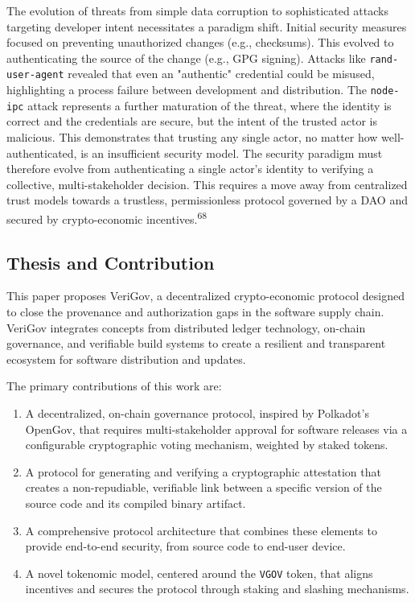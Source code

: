 \documentclass{article}
\begin{document}
The evolution of threats from simple data corruption to sophisticated attacks targeting developer intent necessitates a paradigm shift. Initial security measures focused on preventing unauthorized changes (e.g., checksums). This evolved to authenticating the source of the change (e.g., GPG signing). Attacks like \lstinline{rand-user-agent} revealed that even an "authentic" credential could be misused, highlighting a process failure between development and distribution. The \lstinline{node-ipc} attack represents a further maturation of the threat, where the identity is correct and the credentials are secure, but the intent of the trusted actor is malicious. This demonstrates that trusting any single actor, no matter how well-authenticated, is an insufficient security model. The security paradigm must therefore evolve from authenticating a single actor's identity to verifying a collective, multi-stakeholder decision. This requires a move away from centralized trust models towards a trustless, permissionless protocol governed by a DAO and secured by crypto-economic incentives.\textsuperscript{68}

\subsection{Thesis and Contribution}

This paper proposes VeriGov, a decentralized crypto-economic protocol designed to close the provenance and authorization gaps in the software supply chain. VeriGov integrates concepts from distributed ledger technology, on-chain governance, and verifiable build systems to create a resilient and transparent ecosystem for software distribution and updates.

The primary contributions of this work are:

\begin{enumerate}
\item A decentralized, on-chain governance protocol, inspired by Polkadot's OpenGov, that requires multi-stakeholder approval for software releases via a configurable cryptographic voting mechanism, weighted by staked tokens.
\item A protocol for generating and verifying a cryptographic attestation that creates a non-repudiable, verifiable link between a specific version of the source code and its compiled binary artifact.
\item A comprehensive protocol architecture that combines these elements to provide end-to-end security, from source code to end-user device.
\item A novel tokenomic model, centered around the \lstinline{VGOV} token, that aligns incentives and secures the protocol through staking and slashing mechanisms.
\end{enumerate}
\end{document}

